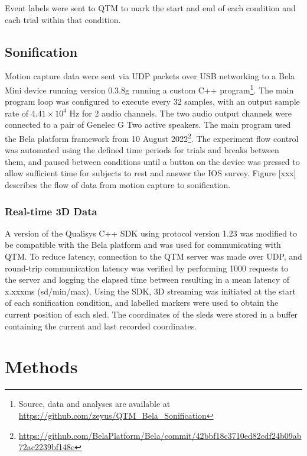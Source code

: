 \documentclass[10pt,a4paper,onecolumn]{article}
\begin{document}
Event labels were sent to QTM to mark the start and end of each condition and each trial within that condition.

\hypertarget{sonification-1}{%
\subsection{Sonification}\label{sonification-1}}

Motion capture data were sent via UDP packets over USB networking to a Bela Mini device running version 0.3.8g running a custom C++ program\footnote{Source, data and analyses are available at \url{https://github.com/zeyus/QTM_Bela_Sonification}}. The main program loop was configured to execute every 32 samples, with an output sample rate of \ensuremath{4.41\times 10^{4}} Hz for 2 audio channels. The two audio output channels were connected to a pair of Genelec G Two active speakers. The main program used the Bela platform framework from 10 August 2022\footnote{\url{https://github.com/BelaPlatform/Bela/commit/42bbf18c3710ed82cdf24b09ab72ac2239bf148e}}. The experiment flow control was automated using the defined time periods for trials and breaks between them, and paused between conditions until a button on the device was pressed to allow sufficient time for subjects to rest and answer the IOS survey. Figure {[}xxx{]} describes the flow of data from motion capture to sonification.

\hypertarget{real-time-3d-data}{%
\subsubsection{Real-time 3D Data}\label{real-time-3d-data}}

A version of the Qualisys C++ SDK using protocol version 1.23 was modified to be compatible with the Bela platform and was used for communicating with QTM. To reduce latency, connection to the QTM server was made over UDP, and round-trip communication latency was verified by performing 1000 requests to the server and logging the elapsed time between resulting in a mean latency of x.xxxms (sd/min/max).
Using the SDK, 3D streaming was initiated at the start of each sonification condition, and labelled markers were used to obtain the current position of each sled. The coordinates of the sleds were stored in a buffer containing the current and last recorded coordinates.

\hypertarget{methods}{%
\section{Methods}\label{methods}}
\end{document}

